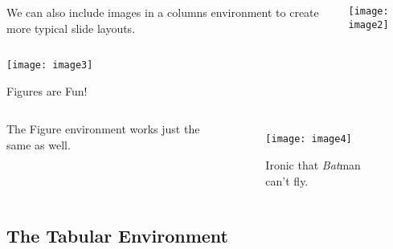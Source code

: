 \documentclass{beamer}
\begin{document}
\begin{frame}

	\begin{columns}
		We can also include images in a columns environment to create more typical slide layouts.
		
	
	\centering										%
	\texttt{[image: image2]}			%
	\end{columns}
	
\end{frame}



\begin{frame}[plain]									%
	\centering
	\texttt{[image: image3]}
	
\end{frame}



\begin{frame}{Figures are Fun!}

	\begin{columns}
	\column{0.5\textwidth}
		The \alert{Figure} environment works just the same as well.
		
	\column{0.5\textwidth}
	
	\centering
	\begin{figure}
		\texttt{[image: image4]}
		\caption{Ironic that \alert{\textit{Bat}}man can't fly.}
	\end{figure}
	
	\end{columns}
	
\end{frame}


\subsection{The Tabular Environment}
\end{document}
